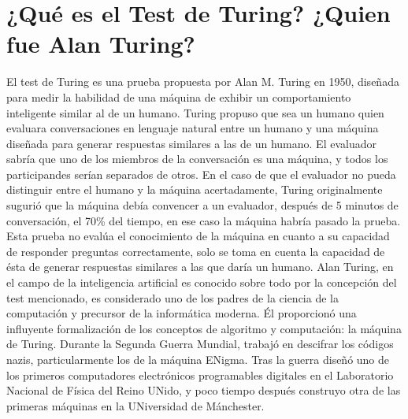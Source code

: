 \documentclass[a4paper,11pt, spanish]{report}
\begin{document}


\section*{¿Qué es el Test de Turing? ¿Quien fue Alan Turing?}
El test de Turing es una prueba propuesta por Alan M. Turing en 1950, diseñada para medir la habilidad de una máquina de exhibir un comportamiento inteligente similar al de un humano. Turing propuso que sea un humano quien evaluara conversaciones en lenguaje natural entre un humano y una máquina diseñada para generar respuestas similares a las de un humano. El evaluador sabría que uno de los miembros de la conversación es una máquina, y todos los participandes serían separados de otros. En el caso de que el evaluador no pueda distinguir entre el humano y la máquina acertadamente, Turing originalmente sugurió que la máquina debía convencer a un evaluador, después de 5 minutos de conversación, el 70\% del tiempo, en ese caso la máquina habría pasado la prueba. Esta prueba no evalúa el conocimiento de la máquina en cuanto a su capacidad de responder preguntas correctamente, solo se toma en cuenta la capacidad de ésta de generar respuestas similares a las que daría un humano.
Alan Turing, en el campo de la inteligencia artificial es conocido sobre todo por la concepción del test mencionado, es considerado uno de los padres de la ciencia de la computación y precursor de la informática moderna. Él proporcionó una influyente formalización de los conceptos de algoritmo y computación: la máquina de Turing. Durante la Segunda Guerra Mundial, trabajó en descifrar los códigos nazis, particularmente los de la máquina ENigma. Tras la guerra diseñó uno de los primeros computadores electrónicos programables digitales en el Laboratorio Nacional de Física del Reino UNido, y poco tiempo después construyo otra de las primeras máquinas en la UNiversidad de Mánchester.
\end{document}
